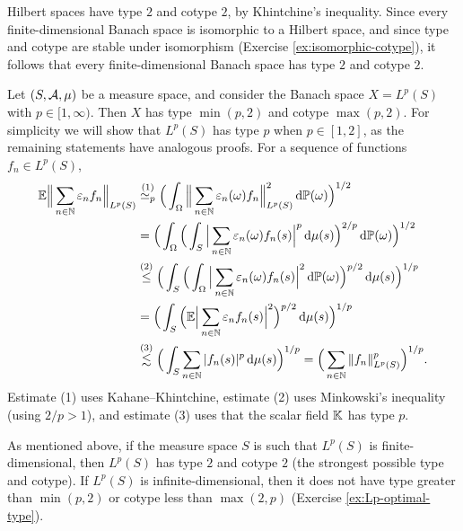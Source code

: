 Hilbert spaces have type $2$ and cotype $2$, by Khintchine's inequality.
Since every finite-dimensional Banach space is isomorphic to a Hilbert space, and since type and cotype are stable under isomorphism (Exercise \ref{ex:isomorphic-cotype}), it follows that every finite-dimensional Banach space has type $2$ and cotype $2$.

\begin{example}
  Let $(S,\mathcal{A},\mu)$ be a measure space, and consider the Banach space $X = L^p(S)$ with $p \in [1,\infty)$.
  Then $X$ has type $\min(p,2)$ and cotype $\max(p,2)$.
  For simplicity we will show that $L^p(S)$ has type $p$ when $p \in [1,2]$, as the remaining statements have analogous proofs.
  For a sequence of functions $f_{n} \in L^p(S)$,
  \begin{equation*}
    \begin{aligned}
      \mathbb{E} \Big\| \sum_{n \in \mathbb{N}} \varepsilon_{n} f_{n} \Big\|_{L^p(S)}
      &\stackrel{(1)}{\simeq_{p}} \Big( \int_{\Omega} \Big\| \sum_{n \in \mathbb{N}} \varepsilon_{n}(\omega) f_{n} \Big\|_{L^p(S)}^{2} \, \mathrm{d}\mathbb{P}(\omega) \Big)^{1/2} \\
      &= \Big( \int_{\Omega} \Big( \int_{S} \Big| \sum_{n \in \mathbb{N}} \varepsilon_{n}(\omega) f_{n}(s) \Big|^{p} \, \mathrm{d}\mu(s) \Big)^{2/p} \, \mathrm{d}\mathbb{P}(\omega) \Big)^{1/2} \\
      &\stackrel{(2)}{\leq} \Big( \int_{S} \Big( \int_{\Omega} \Big| \sum_{n \in \mathbb{N}} \varepsilon_{n}(\omega) f_{n}(s) \Big|^{2} \, \mathrm{d}\mathbb{P}(\omega) \Big)^{p/2} \, \mathrm{d}\mu(s) \Big)^{1/p} \\
      &= \Big( \int_{S} \Big( \mathbb{E} \Big| \sum_{n \in \mathbb{N}} \varepsilon_{n} f_{n}(s) \Big|^{2} \Big)^{p/2} \, \mathrm{d}\mu(s) \Big)^{1/p} \\
      &\stackrel{(3)}{\lesssim} \Big( \int_{S} \sum_{n \in \mathbb{N}} |f_{n}(s)|^{p} \, \mathrm{d}\mu(s) \Big)^{1/p}
      = \Big( \sum_{n \in \mathbb{N}} \|f_{n}\|_{L^p(S)}^{p} \Big)^{1/p}.
    \end{aligned}
  \end{equation*}
  Estimate (1) uses Kahane--Khintchine, estimate (2) uses Minkowski's inequality (using $2/p > 1$), and estimate (3) uses that the scalar field $\mathbb{K}$ has type $p$.
  
  As mentioned above, if the measure space $S$ is such that $L^p(S)$ is finite-dimensional, then $L^p(S)$ has type $2$ and cotype $2$ (the strongest possible type and cotype).
  If $L^p(S)$ is infinite-dimensional, then it does not have type greater than $\min(p,2)$ or cotype less than $\max(2,p)$ (Exercise \ref{ex:Lp-optimal-type}). 
\end{example}

